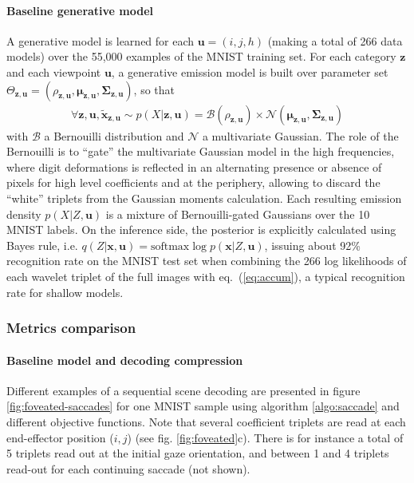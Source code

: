\documentclass[12pt,twoside,openright]{article}
\begin{document}
\paragraph{Baseline generative model}
A generative model is learned for each $\boldsymbol{u} = (i,j,h)$ (making a total of 266 data models) over the 55,000 examples of the MNIST training set. For each category $\boldsymbol{z}$ and each viewpoint $\boldsymbol{u}$, a generative emission model is built over parameter set $\Theta_{\boldsymbol{z},\boldsymbol{u}} = (\rho_{\boldsymbol{z},\boldsymbol{u}}, \boldsymbol{\mu}_{\boldsymbol{z},\boldsymbol{u}}, \boldsymbol{\Sigma}_{\boldsymbol{z},\boldsymbol{u}})$, so that 
\begin{align}
\forall \boldsymbol{z},\boldsymbol{u}, \tilde{\boldsymbol{x}}_{\boldsymbol{z},\boldsymbol{u}} \sim
p(X|\boldsymbol{z},\boldsymbol{u}) =  \mathcal{B}(\rho_{\boldsymbol{z},\boldsymbol{u}}) \times \mathcal{N}(\boldsymbol{\mu}_{\boldsymbol{z},\boldsymbol{u}}, \boldsymbol{\Sigma}_{\boldsymbol{z},\boldsymbol{u}})\label{eq:bernouilli-gated}
\end{align} 
with $\mathcal{B}$ a Bernouilli distribution and $\mathcal{N}$ a multivariate Gaussian. The role of the Bernouilli is to ``gate'' the multivariate Gaussian model in the high frequencies, where digit deformations is reflected in an alternating presence or absence of pixels for high level coefficients and at the periphery, allowing to discard the ``white'' triplets from the Gaussian moments calculation. Each resulting emission density $p(X|Z,\boldsymbol{u})$ is a mixture of Bernouilli-gated Gaussians over the 10 MNIST labels. On the inference side, the posterior is explicitly calculated using Bayes rule, i.e. $q(Z|\boldsymbol{x},\boldsymbol{u}) = \text{softmax} \log p(\boldsymbol{x}|Z,\boldsymbol{u})$, issuing about 92\% recognition rate on the MNIST test set when combining the 266 log likelihoods of each wavelet triplet of the full images with eq.~(\ref{eq:accum}), a typical recognition rate for shallow models.

\subsubsection{Metrics comparison}

\paragraph{Baseline model and decoding compression}
Different examples of a sequential scene decoding are presented in figure \ref{fig:foveated-saccades} for one MNIST sample using algorithm \ref{algo:saccade} and different objective functions.
Note that several coefficient triplets are read at each end-effector position ($i,j$) (see fig. \ref{fig:foveated}c). There is for instance a total of 5 triplets read out at the initial gaze orientation, and between 1 and 4 triplets read-out for each continuing saccade (not shown). 
\end{document}
